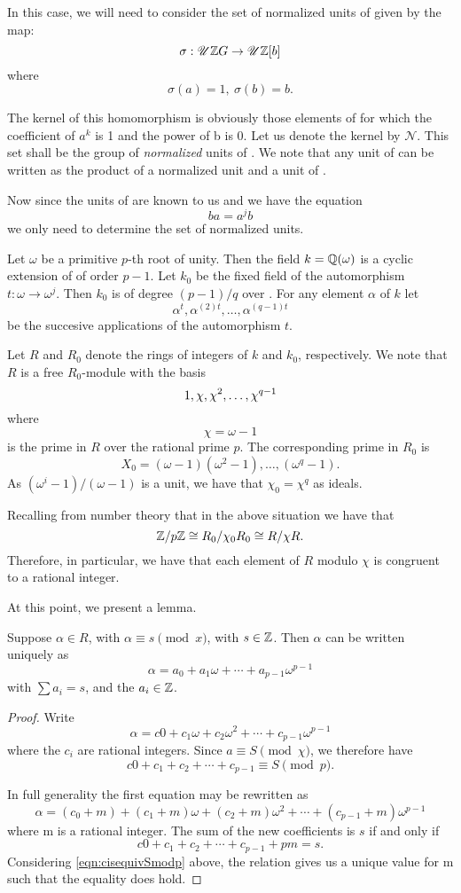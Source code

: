 \documentclass[11pt]{report}
\begin{document}
In this case, we will need to consider the set of normalized 
units of \intG{} given by the map:
\[
\sigma:\ug{\intG} \to \ug{\integers{}[b]}
\]
where
\[
\sigma(a) = 1, \ \sigma(b)=b.
\]


        The kernel of this homomorphism is obviously those elements of
\ug{\intG} 
for which the
coefficient of $a^k$ is 1 and the power of b is 0. Let us denote the 
kernel by $\mathscr{N}$. This set shall be
the group of {\it{normalized}} units of \intG. We note that any unit of \intG{}
can be written as the
product of a normalized unit and a unit of \intb.


        Now since the units of \intb{} are known to us and we have the 
equation
\[        ba = a^jb\]
we only need to determine the set of normalized units.


        Let $\omega$ be a primitive $p$-th root of unity. Then the 
field $k = \rat(\omega)$  
is a cyclic extension
of \rat{} of order $p-1$. Let $k_0$ be the fixed field of the
 automorphism $t:\omega \to \omega^j$. Then $k_0$ is of degree
$(p-1)/q$ over \rat. For any element $\alpha$ of $k$ let
\[\alpha^t, \alpha^{(2)t}, \ldots , \alpha^{(q-1)t}\]
be the succesive applications of the automorphism $t$.


        Let $R$ and $R_0$ denote the rings of integers of $k$ and $k_0$, 
respectively. We note that $R$ is
a free $R_0$-module with the basis\[1,\chi,\supseries[\chi]{2}{q-1}\]
where
\[\chi=\omega-1\]
is the prime    in $R$ over the rational prime $p$. The corresponding 
prime in $R_0$ is
\[X_0 = (\omega-1)(\omega^2-1),\ldots,(\omega^q-1).\]
As $(\omega^i-1)/(\omega-1)$ is a unit, we have that $\chi_0 = \chi^q$ as ideals.


Recalling from number theory that in the above situation we have that
\[\integers/p\integers\cong{}R_0/\chi_0R_0\cong  R/\chi{} R.\]
Therefore, in particular, we have that each element of $R$ modulo $\chi$ 
is congruent to a rational
integer.


        At this point, we present a lemma.
\begin{lemma}
Suppose $\alpha\in{}R$, with $\alpha\equiv{}s\pmod{x}$, with 
$s\in\integers$. Then $\alpha$ can be written 
uniquely as
\[\alpha = a_0+a_1\omega+\cdots+a_{p-1}\omega^{p-1}\]
with $\sum{}a_i = s$, and the $a_i\in\integers$.
\end{lemma}

\begin{proof}
Write \[\alpha =  c0+c_1\omega+c_2\omega^2+\cdots+c_{p-1}\omega^{p-1}\] 
where the $c_i$ are rational integers. Since $a\equiv  S \pmod{\chi}$, we 
therefore have
\begin{equation}
       c0+c_1+c_2+\cdots+c_{p-1} \equiv S \pmod{p}.\label{eqn:cisequivSmodp}
\end{equation}

In full generality the first equation may be rewritten as\[
\alpha = (c_0+m)+(c_1+m)\omega+(c_2+m)\omega^2+\cdots+(c_{p-1}+m)\omega^{p-1}
\]where m is a rational integer. The sum of the new coefficients is 
$s$ if and only if\[ c0+c_1+c_2+\cdots+c_{p-1}+pm = s.\]
Considering \ref{eqn:cisequivSmodp} above, the relation gives us a unique value for m 
such that the equality does
hold.
\end{proof}
\end{document}
